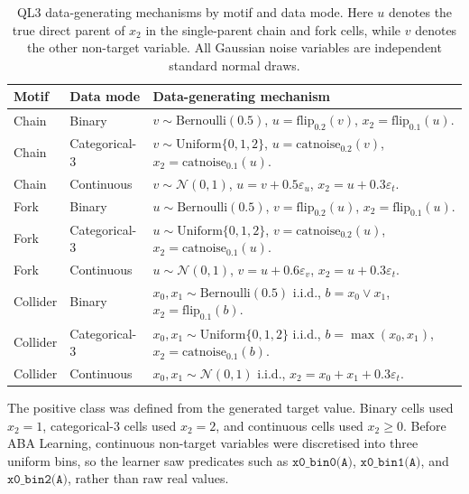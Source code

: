 \begin{table}[htbp]
\centering
\scriptsize
\caption{QL3 data-generating mechanisms by motif and data mode. Here \(u\) denotes the true direct parent of \(x_2\) in the single-parent chain and fork cells, while \(v\) denotes the other non-target variable. All Gaussian noise variables are independent standard normal draws.}
\label{tab:ql3-dgp-mechanisms}
\begin{tabular}{lll}
\toprule
Motif & Data mode & Data-generating mechanism \\
\midrule
Chain & Binary &
\(v\sim\mathrm{Bernoulli}(0.5)\), \(u=\mathrm{flip}_{0.2}(v)\), \(x_2=\mathrm{flip}_{0.1}(u)\). \\
Chain & Categorical-3 &
\(v\sim\mathrm{Uniform}\{0,1,2\}\), \(u=\mathrm{catnoise}_{0.2}(v)\), \(x_2=\mathrm{catnoise}_{0.1}(u)\). \\
Chain & Continuous &
\(v\sim\mathcal{N}(0,1)\), \(u=v+0.5\varepsilon_u\), \(x_2=u+0.3\varepsilon_t\). \\
\midrule
Fork & Binary &
\(u\sim\mathrm{Bernoulli}(0.5)\), \(v=\mathrm{flip}_{0.2}(u)\), \(x_2=\mathrm{flip}_{0.1}(u)\). \\
Fork & Categorical-3 &
\(u\sim\mathrm{Uniform}\{0,1,2\}\), \(v=\mathrm{catnoise}_{0.2}(u)\), \(x_2=\mathrm{catnoise}_{0.1}(u)\). \\
Fork & Continuous &
\(u\sim\mathcal{N}(0,1)\), \(v=u+0.6\varepsilon_v\), \(x_2=u+0.3\varepsilon_t\). \\
\midrule
Collider & Binary &
\(x_0,x_1\sim\mathrm{Bernoulli}(0.5)\) i.i.d., \(b=x_0\lor x_1\), \(x_2=\mathrm{flip}_{0.1}(b)\). \\
Collider & Categorical-3 &
\(x_0,x_1\sim\mathrm{Uniform}\{0,1,2\}\) i.i.d., \(b=\max(x_0,x_1)\), \(x_2=\mathrm{catnoise}_{0.1}(b)\). \\
Collider & Continuous &
\(x_0,x_1\sim\mathcal{N}(0,1)\) i.i.d., \(x_2=x_0+x_1+0.3\varepsilon_t\). \\
\bottomrule
\end{tabular}
\end{table}

The positive class was defined from the generated target value. Binary cells used \(x_2=1\), categorical-3 cells used \(x_2=2\), and continuous cells used \(x_2\geq 0\). Before ABA Learning, continuous non-target variables were discretised into three uniform bins, so the learner saw predicates such as \(\texttt{x0\_bin0(A)}\), \(\texttt{x0\_bin1(A)}\), and \(\texttt{x0\_bin2(A)}\), rather than raw real values.

